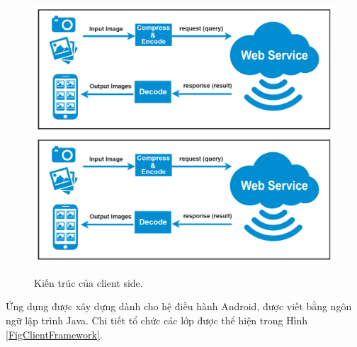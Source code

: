 \begin{figure}[!htbp]
  \begin{center}
    \leavevmode
    \ifpdf
      \includegraphics[scale=0.25]{android_client}
    \else
      \includegraphics[scale=0.25]{android_client}
    \fi
    \caption[Kiến trúc của client side]{Kiến trúc của client side.}
    \label{FigAndroidClient}
  \end{center}
\end{figure}

Ứng dụng được xây dựng dành cho hệ điều hành Android, được viết bằng ngôn ngữ lập trình Java. Chi tiết tổ chức các lớp được thể hiện trong Hình \ref{FigClientFramework}.

